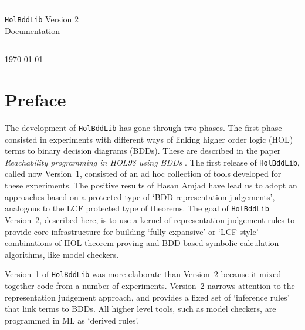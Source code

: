 \documentclass[12pt]{article}
\renewcommand{\t}[1]{\mbox{\tt #1}}
\begin{document}
\thispagestyle{empty}

\hrule height5pt

\begin{flushleft}
{\Huge{\tt HolBddLib} Version 2\\[5mm]
Documentation}
\end{flushleft}

\vspace*{2mm}

\hrule height5pt

\vspace*{1cm}



\vspace*{5mm}

\today

\vfill

{\setlength{\fboxrule}{0.5mm}
\setlength{\fboxsep}{2mm}
}

\vfill

\newpage


\section*{Preface}


The development of {\tt HolBddLib} has gone through two phases.  The
first phase consisted in experiments with different ways of linking
higher order logic (HOL) terms to binary decision diagrams (BDDs).
These are described in the paper {\it Reachability programming in
HOL98 using BDDs\/} \cite{tphols2000-Gordon}. The first release of
\t{HolBddLib}, called now Version~1, consisted of an ad hoc collection
of tools developed for these experiments.  The positive results of
Hasan Amjad \cite{Amjad:TPHOLs2001} have lead us to adopt an
approaches based on a protected type of `BDD representation
judgements', analogous to the LCF protected type of theorems.  The goal
of \t{HolBddLib} Version~2, described here, is to use a kernel of representation
judgement rules to provide core infrastructure for building
`fully-expansive' or `LCF-style' combinations of HOL theorem proving
and BDD-based symbolic calculation algorithms, like model checkers.

Version~1 of {\tt{HolBddLib}} was more elaborate than Version~2
because it mixed together code from a number of experiments.
Version~2 narrows attention to the representation judgement approach,
and provides a fixed set of `inference rules' that link terms to
BDDs. All higher level tools, such as model checkers, are programmed
in ML as `derived rules'.
\end{document}

